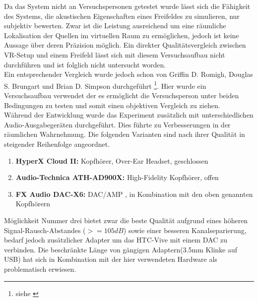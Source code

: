 

Da das System nicht an Versuchspersonen getestet wurde lässt sich die Fähigkeit des Systems, die akustischen Eigenschaften eines Freifeldes zu simulieren, nur subjektiv bewerten.
Zwar ist die Leistung ausreichend um eine räumliche Lokalisation der Quellen im virtuellen Raum zu ermöglichen, jedoch ist keine Aussage über deren Präzision möglich.
Ein direkter Qualitätsvergleich zwischen VR-Setup und einem Freifeld lässt sich mit diesem Versuchsaufbau nicht durchführen und ist folglich nicht untersucht worden.\\
Ein entsprechender Vergleich wurde jedoch schon von Griffin D. Romigh, Douglas S. Brungart und Brian D. Simpson durchgeführt \footnote{siehe \cite{FFC}}. Hier wurde ein Versuchsaufbau verwendet der es ermöglicht die Versuchsperson unter beiden Bedingungen zu testen und somit einen objektiven Vergleich zu ziehen.\\
Während der Entwicklung wurde das Experiment zusätzlich mit unterschiedlichen Audio-Ausgabegeräten durchgeführt. Dies führte zu Verbesserungen in der räumlichen Wahrnehmung.
Die folgenden Varianten sind nach ihrer Qualität in steigender Reihenfolge angeordnet.
\begin{enumerate}
\item \textbf{HyperX Cloud II:} Kopfhörer, Over-Ear Headset, geschlossen
\item \textbf{Audio-Technica ATH-AD900X:}  High-Fidelity Kopfhörer, offen
\item \textbf{FX Audio DAC-X6:} DAC/AMP , in Kombination mit den oben genannten Kopfhörern
\end{enumerate}

Möglichkeit Nummer drei bietet zwar die beste Qualität aufgrund eines höheren Signal-Rausch-Abstandes ($>= 105 dB$) sowie einer besseren Kanalseparierung, bedarf jedoch zusätzlicher Adapter um das HTC-Vive mit einem DAC zu verbinden. Die beschränkte Länge von gängigen Adaptern(3.5mm Klinke auf USB) hat sich in Kombination mit der hier verwendeten Hardware als problematisch erwiesen. 